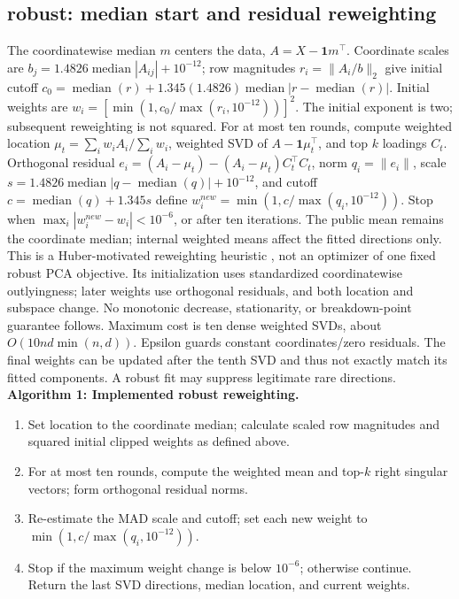 \documentclass[conference]{IEEEtran}
\begin{document}
\subsection{robust: median start and residual reweighting}
The coordinatewise median \(m\) centers the data, \(A=X-\mathbf1m^\top\). Coordinate scales are \(b_j=1.4826\operatorname{median}|A_{ij}|+10^{-12}\); row magnitudes \(r_i=\|A_i/b\|_2\) give initial cutoff \(c_0=\operatorname{median}(r)+1.345(1.4826)\operatorname{median}|r-\operatorname{median}(r)|\). Initial weights are \(w_i=[\min(1,c_0/\max(r_i,10^{-12}))]^2\). The initial exponent is two; subsequent reweighting is not squared.
For at most ten rounds, compute weighted location \(\mu_t=\sum_iw_iA_i/\sum_iw_i\), weighted SVD of \(A-\mathbf1\mu_t^\top\), and top \(k\) loadings \(C_t\). Orthogonal residual \(e_i=(A_i-\mu_t)-(A_i-\mu_t)C_t^\top C_t\), norm \(q_i=\|e_i\|\), scale \(s=1.4826\operatorname{median}|q-\operatorname{median}(q)|+10^{-12}\), and cutoff \(c=\operatorname{median}(q)+1.345s\) define \(w_i^{new}=\min(1,c/\max(q_i,10^{-12}))\). Stop when \(\max_i|w_i^{new}-w_i|<10^{-6}\), or after ten iterations. The public mean remains the coordinate median; internal weighted means affect the fitted directions only.
This is a Huber-motivated reweighting heuristic \cite{huber1981}, not an optimizer of one fixed robust PCA objective. Its initialization uses standardized coordinatewise outlyingness; later weights use orthogonal residuals, and both location and subspace change. No monotonic decrease, stationarity, or breakdown-point guarantee follows. Maximum cost is ten dense weighted SVDs, about \(O(10nd\min(n,d))\). Epsilon guards constant coordinates/zero residuals. The final weights can be updated after the tenth SVD and thus not exactly match its fitted components. A robust fit may suppress legitimate rare directions.
\noindent\textbf{Algorithm 1: Implemented robust reweighting.}
\begin{enumerate}
\item Set location to the coordinate median; calculate scaled row magnitudes and squared initial clipped weights as defined above.
\item For at most ten rounds, compute the weighted mean and top-$k$ right singular vectors; form orthogonal residual norms.
\item Re-estimate the MAD scale and cutoff; set each new weight to $\min(1,c/\max(q_i,10^{-12}))$.
\item Stop if the maximum weight change is below $10^{-6}$; otherwise continue. Return the last SVD directions, median location, and current weights.
\end{enumerate}
\end{document}
